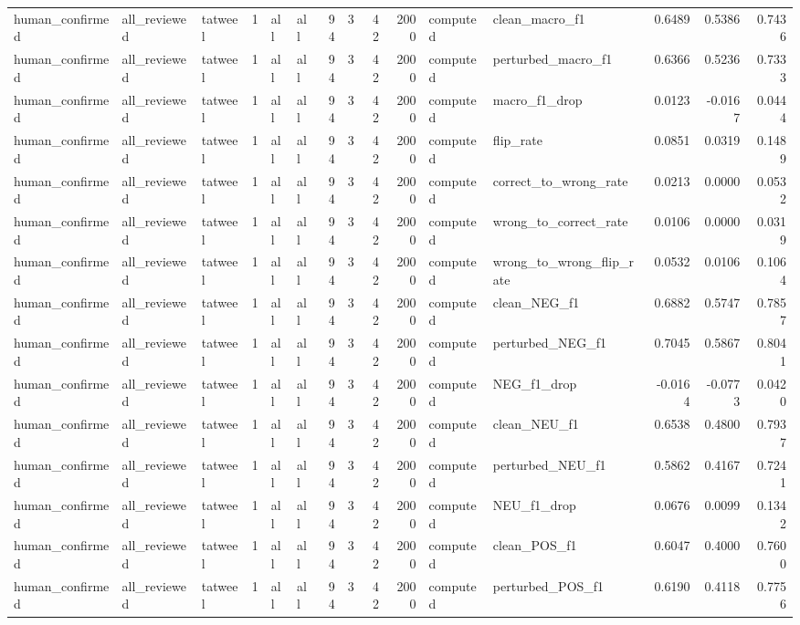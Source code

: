 \begin{tabular}{lllrllrrrrllrrr}
human_confirmed & all_reviewed & tatweel & 1 & all & all & 94 & 3 & 42 & 2000 & computed & clean_macro_f1 & 0.6489 & 0.5386 & 0.7436 \\
human_confirmed & all_reviewed & tatweel & 1 & all & all & 94 & 3 & 42 & 2000 & computed & perturbed_macro_f1 & 0.6366 & 0.5236 & 0.7333 \\
human_confirmed & all_reviewed & tatweel & 1 & all & all & 94 & 3 & 42 & 2000 & computed & macro_f1_drop & 0.0123 & -0.0167 & 0.0444 \\
human_confirmed & all_reviewed & tatweel & 1 & all & all & 94 & 3 & 42 & 2000 & computed & flip_rate & 0.0851 & 0.0319 & 0.1489 \\
human_confirmed & all_reviewed & tatweel & 1 & all & all & 94 & 3 & 42 & 2000 & computed & correct_to_wrong_rate & 0.0213 & 0.0000 & 0.0532 \\
human_confirmed & all_reviewed & tatweel & 1 & all & all & 94 & 3 & 42 & 2000 & computed & wrong_to_correct_rate & 0.0106 & 0.0000 & 0.0319 \\
human_confirmed & all_reviewed & tatweel & 1 & all & all & 94 & 3 & 42 & 2000 & computed & wrong_to_wrong_flip_rate & 0.0532 & 0.0106 & 0.1064 \\
human_confirmed & all_reviewed & tatweel & 1 & all & all & 94 & 3 & 42 & 2000 & computed & clean_NEG_f1 & 0.6882 & 0.5747 & 0.7857 \\
human_confirmed & all_reviewed & tatweel & 1 & all & all & 94 & 3 & 42 & 2000 & computed & perturbed_NEG_f1 & 0.7045 & 0.5867 & 0.8041 \\
human_confirmed & all_reviewed & tatweel & 1 & all & all & 94 & 3 & 42 & 2000 & computed & NEG_f1_drop & -0.0164 & -0.0773 & 0.0420 \\
human_confirmed & all_reviewed & tatweel & 1 & all & all & 94 & 3 & 42 & 2000 & computed & clean_NEU_f1 & 0.6538 & 0.4800 & 0.7937 \\
human_confirmed & all_reviewed & tatweel & 1 & all & all & 94 & 3 & 42 & 2000 & computed & perturbed_NEU_f1 & 0.5862 & 0.4167 & 0.7241 \\
human_confirmed & all_reviewed & tatweel & 1 & all & all & 94 & 3 & 42 & 2000 & computed & NEU_f1_drop & 0.0676 & 0.0099 & 0.1342 \\
human_confirmed & all_reviewed & tatweel & 1 & all & all & 94 & 3 & 42 & 2000 & computed & clean_POS_f1 & 0.6047 & 0.4000 & 0.7600 \\
human_confirmed & all_reviewed & tatweel & 1 & all & all & 94 & 3 & 42 & 2000 & computed & perturbed_POS_f1 & 0.6190 & 0.4118 & 0.7756 \\

\end{tabular}
